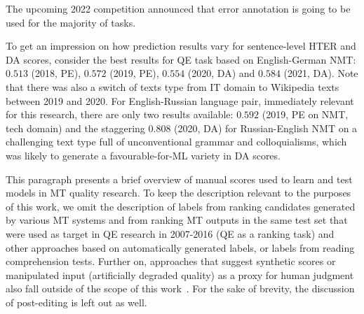 The upcoming 2022 competition announced that error annotation is going to be used for the majority of tasks.

To get an impression on how prediction results vary for sentence-level HTER and DA scores, consider the best results for QE task based on English-German NMT: $0.513$ (2018, \gls*{PE}), $0.572$ (2019, PE), $0.554$ (2020, DA) and $0.584$ (2021, DA). Note that there was also a switch of texts type from IT domain to Wikipedia texts between 2019 and 2020. For English-Russian language pair, immediately relevant for this research, there are only two results available: $0.592$ (2019, PE on NMT, tech domain) and the staggering $0.808$ (2020, DA) for Russian-English NMT on a challenging text type full of unconventional grammar and colloquialisms, which was likely to generate a favourable-for-ML variety in DA scores.  
   
This paragraph presents a brief overview of manual scores used to learn and test models in MT quality research.
To keep the description relevant to the purposes of this work, we omit the description of labels from ranking candidates generated by various MT systems and from ranking MT outputs in the same test set that were used as target in QE research in 2007-2016 (QE as a ranking task) and other approaches based on automatically generated labels, or labels from reading comprehension tests. Further on, approaches that suggest synthetic scores or manipulated input (artificially degraded quality) as a proxy for human judgment also fall outside of the scope of this work~\cite[see, for example,][where they introduce modifications into MT output to capture critical errors related to sentiment transfer]{Saadany2021}. 
For the sake of brevity, the discussion of post-editing is left out as well. 

